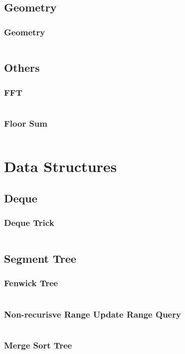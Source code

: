 \documentclass[a4paper,landscape,9pt,twocolumn]{article}
\begin{document}
\subsection{Geometry}
\subsubsection{Geometry}
\inputminted{python}{codes/math/geo.py}

\subsection{Others}
\subsubsection{FFT}
\inputminted{python}{codes/math/fft.py}
\subsubsection{Floor Sum}
\inputminted{python}{codes/math/floorsum.py}

\section{Data Structures}
\subsection{Deque}
\subsubsection{Deque Trick}
\inputminted{python}{codes/ds/deque.py}
\subsection{Segment Tree}
\subsubsection{Fenwick Tree}
\inputminted{python}{codes/ds/fenwick.py}
\subsubsection{Non-recurisve Range Update Range Query}
\inputminted{python}{codes/ds/lazyseg.py}
\subsubsection{Merge Sort Tree}
\inputminted{python}{codes/ds/mst.py}
\end{document}
